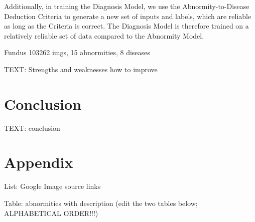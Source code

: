 \documentclass{article}
\begin{document}
	Additionally, in training the Diagnosis Model, we use the Abnormity-to-Disease Deduction Criteria to generate a new set of inputs and labels, which are reliable as long as the Criteria is correct. The Diagnosis Model is therefore trained on a relatively reliable set of data compared to the Abnormity Model. 
	
	\vspace{0.3cm}
	
	Fundus 103262 imgs, 15 abnormities, 8 diseases \autocite{Son2023}
	
	TEXT: Strengths and weaknesses
	how to improve
	
	\section{Conclusion}
	
	TEXT: conclusion
	
	\newrefcontext[sorting=nyt]
	\printbibliography
	
	\pagebreak
	\section*{Appendix}
	
	List: Google Image source links
	
	Table: abnormities with description (edit the two tables below; ALPHABETICAL ORDER!!!)
	
\end{document}
